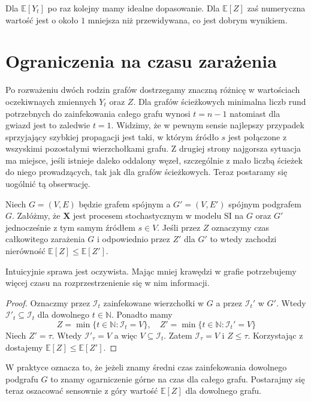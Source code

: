 Dla $\mathbb{E}[Y_t]$ po raz kolejny mamy idealne dopasowanie. Dla $\mathbb{E}[Z]$ zaś numeryczna wartość jest o około $1$ mniejsza niż przewidywana, co jest dobrym wynikiem.


\section{Ograniczenia na czasu zarażenia}
Po rozważeniu dwóch rodzin grafów dostrzegamy znaczną różnicę w wartościach oczekiwnaych zmiennych $Y_t$ oraz $Z$. Dla grafów ścieżkowych minimalna liczb rund potrzebnych do zainfekowania całego grafu wynosi $t=n-1$ natomiast dla gwiazd jest to zaledwie $t=1$. Widzimy, że w pewnym sensie najlepszy przypadek sprzyjający szybkiej propagacji jest taki, w którym źródło $s$ jest połączone z wszyskimi pozostałymi wierzchołkami grafu. Z drugiej strony najgorsza sytuacja ma miejsce, jeśli istnieje daleko oddalony węzeł, szczególnie z mało liczbą ścieżek do niego prowadzących, tak jak dla grafów ścieżkowych. Teraz postaramy się uogólnić tą obserwację. 

\begin{theorem}\label{T:montonicity_of_total_infection}
Niech $G=(V,E)$ będzie grafem spójnym a $G'=(V,E')$ spójnym podgrafem $G$. Załóżmy, że $\mathbf{X}$ jest procesem stochastycznym w modelu SI na $G$ oraz $G'$ jednocześnie z tym samym źródłem $s\in V$. Jeśli przez $Z$ oznaczymy czas całkowitego zarażenia $G$ i odpowiednio przez $Z'$ dla $G'$ to wtedy zachodzi nierówność $\mathbb{E}[Z]\le\mathbb{E}[Z']$. 
\end{theorem}

Intuicyjnie sprawa jest oczywista. Mając mniej krawędzi w grafie potrzebujemy więcej czasu na rozprzestrzenienie się w nim informacji.

\begin{proof}
Oznaczmy przez $\mathcal{I}_t$ zainfekowane wierzchołki w $G$ a przez $\mathcal{I}_t'$ w $G'$. Wtedy $\mathcal{I}'_t\subseteq\mathcal{I}_t$ dla dowolnego $t\in\mathbb{N}$. Ponadto mamy
\[
    Z = \min\{t\in\mathbb{N} : \mathcal{I}_t=V\},  \quad Z' = \min\{t\in\mathbb{N} : \mathcal{I}_t'=V\}
\]
Niech $Z' = \tau$. Wtedy $\mathcal{I}'_\tau =V$ a więc $V\subseteq \mathcal{I}_t$. Zatem $\mathcal{I}_\tau = V$ i $Z\le \tau$. Korzystając z  dostajemy $\mathbb{E}[Z]\le\mathbb{E}[Z']$.
\end{proof}

W praktyce oznacza to, że jeżeli znamy średni czas zainfekowania dowolnego podgrafu $G$ to znamy ogarniczenie górne na czas dla całego grafu. Postarajmy się teraz oszacować sensownie z góry  wartość $\mathbb{E}[Z]$ dla dowolnego grafu.

